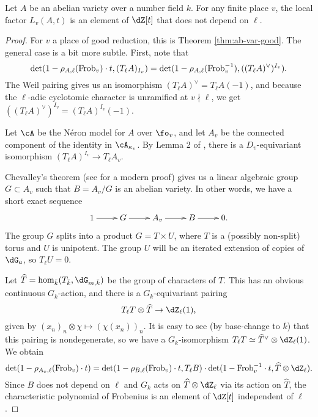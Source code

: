 \begin{theorem}
Let $A$ be an abelian variety over a number field $k$. For any finite place 
$v$, the local factor $L_v(A,t)$ is an element of $\dZ[t]$ that does not depend 
on $\ell$. 
\end{theorem}
\begin{proof}
For $v$ a place of good reduction, this is Theorem \ref{thm:ab-var-good}. The 
general case is a bit more subtle. First, note that 
\[
  \det(1-\rho_{A,\ell}(\mathrm{Frob}_v)\cdot t,(T_\ell A)_{I_v}) 
    = \det(1-\rho_{A,\ell}(\mathrm{Frob}_v^{-1}),((T_\ell A)^\vee)^{I_v}) \text{.}
\]
The Weil pairing gives us an isomorphism $(T_\ell A)^\vee= T_\ell A(-1)$, 
and because the $\ell$-adic cyclotomic character is unramified at 
$v\nmid \ell$, we get $((T_\ell A)^\vee)^{I_v} = (T_\ell A)^{I_v}(-1)$. 

Let $\cA$ be the N\'eron model for $A$ over 
$\fo_v$, and let $A_v$ be the connected component of the identity in 
$\cA_{\kappa_v}$. By Lemma 2 of \cite{st68}, there is a $D_v$-equivariant 
isomorphism $(T_\ell A)^{I_v} \to T_\ell A_v$. 

Chevalley's theorem (see \cite{co02} for a modern proof) gives us a linear 
algebraic group $G\subset A_v$ such that $B=A_v/G$ is an abelian variety. In 
other words, we have a short exact sequence 
\[\xymatrix{
  1 \ar[r] 
    & G \ar[r] 
    & A_v \ar[r] 
    & B \ar[r] 
    & 0 \text{.} 
}\]
The group $G$ splits into a product $G=T\times U$, where $T$ is a (possibly 
non-split) torus and $U$ is unipotent. The group $U$ will be an iterated 
extension of copies of $\dG_a$, so $T_\ell U=0$. 

Let $\widehat T=\hom_{\bar k}(T_{\bar k},\dG_{m,\bar k})$ be the group of 
characters of $T$. This has an obvious continuous $G_k$-action, and there is a 
$G_k$-equivariant pairing 
\[
  T_\ell T \otimes \widehat T \to \dZ_\ell(1) \text{,}
\]
given by $(x_n)_n\otimes \chi \mapsto (\chi(x_n))_n$. It is easy to see (by 
base-change to $\bar k$) that this pairing is nondegenerate, so we have a 
$G_k$-isomorphism $T_\ell T \simeq \widehat T^\vee \otimes \dZ_\ell(1)$. 
We obtain 
\[
  \det(1-\rho_{A_v,\ell}(\frob_v)\cdot t) = \det(1-\rho_{B,\ell}(\frob_v)\cdot t,T_\ell B) \cdot \det(1-\frob_v^{-1}\cdot t,\widehat T\otimes \dZ_\ell) \text{.}
\]
Since $B$ does not depend on $\ell$ and $G_k$ acts on 
$\widehat T\otimes \dZ_\ell$ via its action on $\widehat T$, the characteristic 
polynomial of Frobenius is an element of $\dZ[t]$ independent of $\ell$. 
\end{proof}

